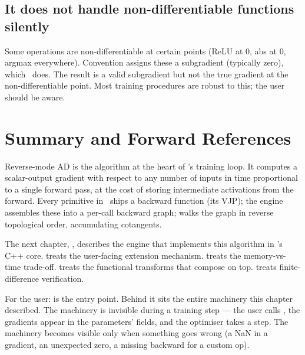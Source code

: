 \subsection{It does not handle non-differentiable functions silently}
\label{ssec:ad_theory:no_nondiff}

Some operations are non-differentiable at certain points (ReLU at
0, abs at 0, argmax everywhere). Convention assigns these a
subgradient (typically zero), which \Lucid\ does. The result is a
valid subgradient but not the true gradient at the
non-differentiable point. Most training procedures are robust to
this; the user should be aware.

\section{Summary and Forward References}
\label{sec:ad_theory:summary}

Reverse-mode AD is the algorithm at the heart of \Lucid's
training loop. It computes a scalar-output gradient with respect
to any number of inputs in time proportional to a single forward
pass, at the cost of storing intermediate activations from the
forward. Every primitive in \Lucid\ ships a backward function
(its VJP); the engine assembles these into a per-call backward
graph;  walks the graph in reverse topological
order, accumulating cotangents.

The next chapter, , describes the
engine that implements this algorithm in \Lucid's C++ core.
 treats the user-facing extension
mechanism.  treats the
memory-vs-time trade-off.  treats the
functional transforms that compose on top.
 treats finite-difference verification.

\begin{lucidnote}
For the user:  is the entry point. Behind
it sits the entire machinery this chapter described. The
machinery is invisible during a training step --- the user calls
, the gradients appear in the parameters'
 fields, and the optimiser takes a step. The
machinery becomes visible only when something goes wrong (a NaN
in a gradient, an unexpected zero, a missing backward for a
custom op).
\end{lucidnote}
